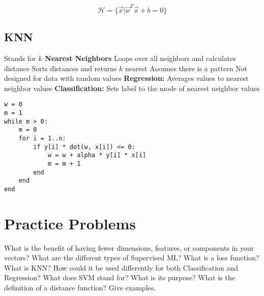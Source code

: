 \[
\mathcal{H} = \{\vec{x} | \vec{w}^T\vec{x} + b = 0\}
\]



\subsection{KNN\cite{guo2003knn}}
\begin{outline}
    \1 Stands for \textbf{$k$ Nearest Neighbors}
    \1 Loops over all neighbors and calculates distance
    \1 Sorts distances and returns $k$ nearest
    \1 Assumes there is a pattern
    \1 Not designed for data with random values
    \1 \textbf{Regression:} Averages values to nearest neighbor values
    \1 \textbf{Classification:} Sets label to the mode of nearest neighbor values
\end{outline}

\begin{verbatim}
w = 0
m = 1
while m > 0:
    m = 0
    for i = 1..n:
        if y[i] * dot(w, x[i]) <= 0:
            w = w + alpha * y[i] * x[i]
            m = m + 1
        end
    end
end
\end{verbatim}

\section{Practice Problems}

\begin{outline}[enumerate]
    \1 What is the benefit of having fewer dimensions, features, or components in your vectors?
    \1 What are the different types of Supervised ML?
    \1 What is a loss function?
    \1 What is KNN? How could it be used differently for both Classification and Regression?
    \1 What does SVM stand for? What is its purpose?
    \1 What is the definition of a distance function? Give examples.
\end{outline}


